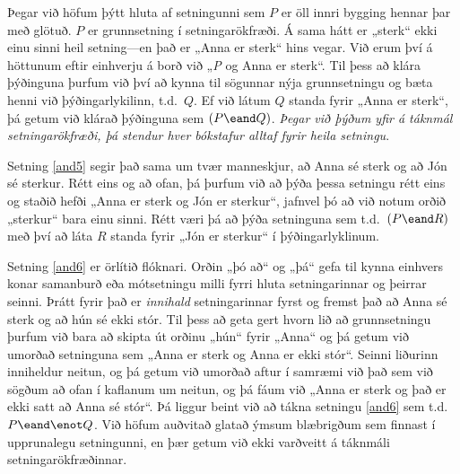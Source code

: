 Þegar við höfum þýtt hluta af setningunni sem $P$ er öll innri bygging hennar þar með glötuð. $P$ er grunnsetning í setningarökfræði. Á sama hátt er „sterk“ ekki einu sinni heil setning---en það er „Anna er sterk“ hins vegar. Við erum því á höttunum eftir einhverju á borð við „\emph{P} og Anna er sterk“. Til þess að klára þýðinguna þurfum við því að kynna til sögunnar nýja grunnsetningu og bæta henni við þýðingarlykilinn, t.d.\ $Q$. Ef við látum $Q$ standa fyrir „Anna er sterk“, þá getum við klárað þýðinguna sem $(P \eand Q)$. \emph{Þegar við þýðum yfir á táknmál setningarökfræði, þá stendur hver bókstafur alltaf fyrir heila setningu}.

Setning \ref{and5} segir það sama um tvær manneskjur, að Anna sé sterk og að Jón sé sterkur. Rétt eins og að ofan, þá þurfum við að þýða þessa setningu rétt eins og staðið hefði „Anna er sterk og Jón er sterkur“, jafnvel þó að við notum orðið „sterkur“ bara einu sinni. Rétt væri þá að þýða setninguna sem t.d.\ $(P \eand R)$ með því að láta $R$ standa fyrir „Jón er sterkur“ í þýðingarlyklinum.

Setning \ref{and6} er örlítið flóknari. Orðin „þó að“ og „þá“ gefa til kynna einhvers konar samanburð eða mótsetningu milli fyrri hluta setningarinnar og þeirrar seinni. Þrátt fyrir það er \emph{innihald} setningarinnar fyrst og fremst það að Anna sé sterk og að hún sé ekki stór. Til þess að geta gert hvorn lið að grunnsetningu þurfum við bara að skipta út orðinu „hún“ fyrir „Anna“ og þá getum við umorðað setninguna sem „Anna er sterk og Anna er ekki stór“. Seinni liðurinn inniheldur neitun, og þá getum við umorðað aftur í samræmi við það sem við sögðum að ofan í kaflanum um neitun, og þá fáum við „Anna er sterk og það er ekki satt að Anna sé stór“. Þá liggur beint við að tákna setningu \ref{and6} sem t.d. $P \eand \enot Q$. Við höfum auðvitað glatað ýmsum blæbrigðum sem finnast í upprunalegu setningunni, en þær getum við ekki varðveitt á táknmáli setningarökfræðinnar.

